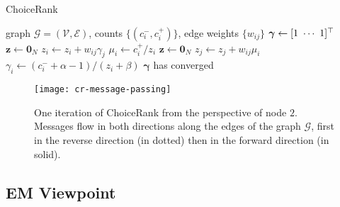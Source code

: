 \begin{algorithm}
  \caption{ChoiceRank}
  \label{cr:alg:choicerank}
  \begin{algorithmic}[1]
    \Require graph $\mathcal{G} = (\mathcal{V}, \mathcal{E})$, counts $\{ (c^-_i, c^+_i) \}$, edge weights $\{ w_{ij} \}$
    \State $\bm{\gamma} \gets [1 \ \cdots \ 1]^\Tr$
    \Repeat
      \State $\bm{z} \gets \bm{0}_N$
       $z_i \gets z_i + w_{ij} \gamma_j$ \label{cr:line:msg1}
       $\mu_i \gets c^+_i / z_i$
      \State $\bm{z} \gets \bm{0}_N$
       $z_j \gets z_j + w_{ij} \mu_i$ \label{cr:line:msg2}
       $\gamma_i \gets (c^-_i + \alpha - 1) / (z_i + \beta)$
    \Until $\bm{\gamma}$ has converged
  \end{algorithmic}
\end{algorithm}

\begin{figure}[t]
  \centering
  \texttt{[image: cr-message-passing]}
  \caption{One iteration of ChoiceRank from the perspective of node $2$.
  Messages flow in both directions along the edges of the graph $\mathcal{G}$, first in the reverse direction (in dotted) then in the forward direction (in solid).}
  \label{cr:fig:msgpassing}
\end{figure}

\subsection{EM Viewpoint}

